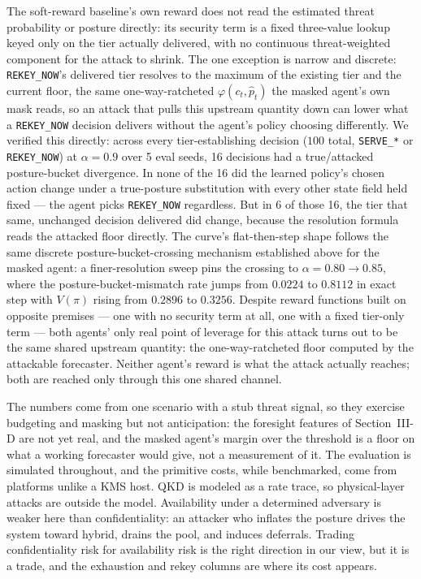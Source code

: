 \documentclass[conference]{IEEEtran}
\begin{document}
The soft-reward baseline's own reward does not read the estimated
threat probability or posture directly: its security term is a fixed
three-value lookup keyed only on the tier actually delivered, with no
continuous threat-weighted component for the attack to shrink. The one
exception is narrow and discrete: \texttt{REKEY\_NOW}'s delivered tier
resolves to the maximum of the existing tier and the current floor,
the same one-way-ratcheted $\varphi(c_t, \hat{p}_t)$ the masked
agent's own mask reads, so an attack that pulls this upstream quantity
down can lower what a \texttt{REKEY\_NOW} decision delivers without
the agent's policy choosing differently. We verified this directly:
across every tier-establishing decision ($100$ total, \texttt{SERVE\_*}
or \texttt{REKEY\_NOW}) at $\alpha=0.9$ over 5 eval seeds, 16 decisions
had a true/attacked posture-bucket divergence. In none of the 16 did
the learned policy's chosen action change under a true-posture
substitution with every other state field held fixed --- the agent
picks \texttt{REKEY\_NOW} regardless. But in 6 of those 16, the tier
that same, unchanged decision delivered did change, because the
resolution formula reads the attacked floor directly. The curve's
flat-then-step shape follows the same discrete posture-bucket-crossing
mechanism established above for the masked agent: a finer-resolution
sweep pins the crossing to $\alpha = 0.80 \to 0.85$, where the
posture-bucket-mismatch rate jumps from $0.0224$ to $0.8112$ in exact
step with $V(\pi)$ rising from $0.2896$ to $0.3256$. Despite reward
functions built on opposite premises --- one with no security term at
all, one with a fixed tier-only term --- both agents' only real point
of leverage for this attack turns out to be the same shared upstream
quantity: the one-way-ratcheted floor computed by the attackable
forecaster. Neither agent's reward is what the attack actually
reaches; both are reached only through this one shared channel.

The numbers come from one scenario with a stub threat
signal, so they exercise budgeting and masking but not anticipation: the foresight features of Section~III-D are not yet real,
and the masked agent's margin over the threshold is a floor on
what a working forecaster would give, not a measurement of
it. The evaluation is simulated throughout, and the primitive
costs, while benchmarked, come from platforms unlike a
KMS host. QKD is modeled as a rate trace, so physical-layer
attacks are outside the model. Availability under a determined
adversary is weaker here than confidentiality: an attacker who
inflates the posture drives the system toward hybrid, drains
the pool, and induces deferrals. Trading confidentiality risk
for availability risk is the right direction in our view, but it is
a trade, and the exhaustion and rekey columns are where its
cost appears.
\end{document}

